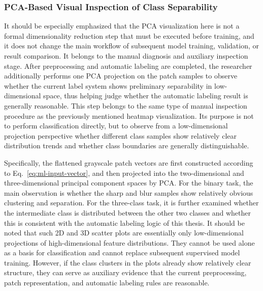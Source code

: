 \subsubsection{PCA-Based Visual Inspection of Class Separability}
\par It should be especially emphasized that the PCA visualization here is not
a formal dimensionality reduction step that must be executed before training,
and it does not change the main workflow of subsequent model training,
validation, or result comparison. It belongs to the manual diagnosis and
auxiliary inspection stage. After preprocessing and automatic labeling are
completed, the researcher additionally performs one PCA projection on the patch
samples to observe whether the current label system shows preliminary
separability in low-dimensional space, thus helping judge whether the
automatic labeling result is generally reasonable. This step belongs to the
same type of manual inspection procedure as the previously mentioned heatmap
visualization. Its purpose is not to perform classification directly, but to
observe from a low-dimensional projection perspective whether different class
samples show relatively clear distribution trends and whether class boundaries
are generally distinguishable.

\par Specifically, the flattened grayscale patch vectors are first constructed
according to Eq.~\eqref{eq:ml-input-vector}, and then projected into the
two-dimensional and three-dimensional principal component spaces by PCA. For
the binary task, the main observation is whether the sharp and blur samples
show relatively obvious clustering and separation. For the three-class task, it
is further examined whether the intermediate class is distributed between the
other two classes and whether this is consistent with the automatic labeling
logic of this thesis. It should be noted that such 2D and 3D scatter plots are
essentially only low-dimensional projections of high-dimensional feature
distributions. They cannot be used alone as a basis for classification and
cannot replace subsequent supervised model training. However, if the class
clusters in the plots already show relatively clear structure, they can serve
as auxiliary evidence that the current preprocessing, patch representation, and
automatic labeling rules are reasonable.

